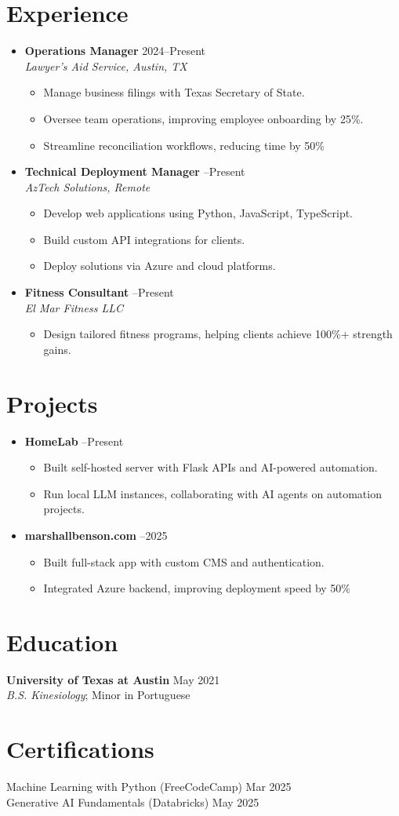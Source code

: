\documentclass[letterpaper,10pt]{article}
\newcommand{\resumeItem}[1]{\item \small{#1}}
\begin{document}
\section*{Experience}
\begin{itemize}
  \item[]
    \textbf{Operations Manager} \hfill 2024--Present \\
    \textit{Lawyer's Aid Service, Austin, TX}
  \begin{itemize}
    \resumeItem{Manage business filings with Texas Secretary of State.}
    \resumeItem{Oversee team operations, improving employee onboarding by 25\%.}
    \resumeItem{Streamline reconciliation workflows, reducing time by 50\%}
  \end{itemize}

  \item[]
    \textbf{Technical Deployment Manager} --Present \\
    \textit{AzTech Solutions, Remote}
  \begin{itemize}
    \resumeItem{Develop web applications using Python, JavaScript, TypeScript.}
    \resumeItem{Build custom API integrations for clients.}
    \resumeItem{Deploy solutions via Azure and cloud platforms.}
  \end{itemize}

  \item[]
    \textbf{Fitness Consultant} --Present \\
    \textit{El Mar Fitness LLC}
  \begin{itemize}
    \resumeItem{Design tailored fitness programs, helping clients achieve 100\%+ strength gains.}
  \end{itemize}
\end{itemize}

\section*{Projects}
\begin{itemize}
  \item[]
    \textbf{HomeLab} --Present
  \begin{itemize}
    \resumeItem{Built self-hosted server with Flask APIs and AI-powered automation.}
    \resumeItem{Run local LLM instances, collaborating with AI agents on automation projects.}
  \end{itemize}

  \item[]
    \textbf{marshallbenson.com} --2025
  \begin{itemize}
    \resumeItem{Built full-stack app with custom CMS and authentication.}
    \resumeItem{Integrated Azure backend, improving deployment speed by 50\%}
  \end{itemize}
\end{itemize}

\section*{Education}
\textbf{University of Texas at Austin} \hbar May 2021 \\
\textit{B.S. Kinesiology}; Minor in Portuguese

\section*{Certifications}
Machine Learning with Python (FreeCodeCamp) \hbar Mar 2025 \\
Generative AI Fundamentals (Databricks) \hbar May 2025
\end{document}
